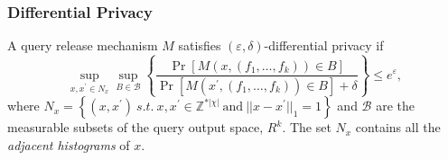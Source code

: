 \begin{frame}[allowframebreaks]%
\frametitle{Differential Privacy}
\begin{definition}
\label{def:dif_priv} A query release mechanism $M$ satisfies $(\varepsilon
,\delta )$-differential privacy if
\begin{equation*}
\sup_{x,x^{\prime }\in N_{x}}\sup_{B\in \mathcal{B}}\left\{ \frac{\Pr \left[
M(x,(f_{1},\ldots ,f_{k}))\in B\right] }{\Pr \left[ M(x^{\prime
},(f_{1},\ldots ,f_{k}))\in B\right] +\delta }\right\} \leq e^{\varepsilon },
\end{equation*}%
where $N_{x}=\left\{ (x,x^{\prime })\ s.t.~x,x^{\prime }\in \mathbb{Z}^{\ast
|\chi |}~\text{and}~||x-x^{\prime }||_{1}=1\right\} $ and $\mathcal{B}$ are
the measurable subsets of the query output space, $R^{k}$. The set $N_{x}$
contains all the \textit{adjacent histograms} of $x$.
\end{definition}

\end{frame}%
%


